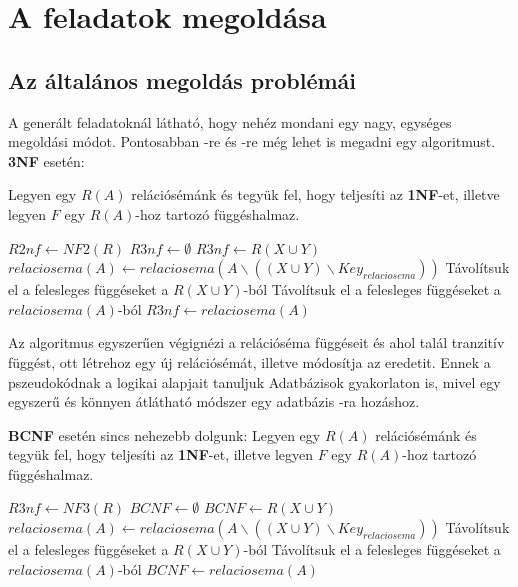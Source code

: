 \chapter{A feladatok megoldása}

\section{Az általános megoldás problémái}

A generált feladatoknál látható, hogy nehéz mondani egy nagy, egységes megoldási módot. Pontosabban \nfh-re és \BCNF-re még lehet is megadni egy algoritmust. \textbf{3NF} esetén: \par
Legyen egy $R(A)$ relációsémánk és tegyük fel, hogy teljesíti az \textbf{1NF}-et, illetve legyen $F$ egy $R(A)$-hoz tartozó függéshalmaz.
\hfill \break
\begin{algorithmic}
        \State $R2nf \gets NF2(R)$
        \State $R3nf \gets \emptyset$
                    \State $R3nf \gets R(X\cup Y)$
                    \State $relaciosema(A) \gets relaciosema(A \backslash ((X\cup Y) \backslash Key_{relaciosema}))$ 
                    \State Távolítsuk el a felesleges függéseket a $R(X \cup Y)$-ból
                \EndIf
            \EndFor
            \State Távolítsuk el a felesleges függéseket a $relaciosema(A)$-ból
            \State $R3nf \gets relaciosema(A)$
        \EndFor
    \EndFunction
\end{algorithmic}
\hfill \break
Az algoritmus egyszerűen végignézi a relációséma függéseit és ahol talál tranzitív függést, ott létrehoz egy új relációsémát, illetve módosítja az eredetit. Ennek a pszeudokódnak a logikai alapjait tanuljuk Adatbázisok gyakorlaton is, mivel egy egyszerű és könnyen átlátható módszer egy adatbázis \nfh-ra hozáshoz. \par
\textbf{BCNF} esetén sincs nehezebb dolgunk:
Legyen egy $R(A)$ relációsémánk és tegyük fel, hogy teljesíti az \textbf{1NF}-et, illetve legyen $F$ egy $R(A)$-hoz tartozó függéshalmaz.
\hfill \break
\begin{algorithmic}
        \State $R3nf \gets NF3(R)$
        \State $BCNF \gets \emptyset$
                    \State $BCNF \gets R(X\cup Y)$
                    \State $relaciosema(A) \gets relaciosema(A \backslash ((X\cup Y) \backslash Key_{relaciosema}))$ 
                    \State Távolítsuk el a felesleges függéseket a $R(X \cup Y)$-ból
                \EndIf
            \EndFor
            \State Távolítsuk el a felesleges függéseket a $relaciosema(A)$-ból
            \State $BCNF \gets relaciosema(A)$
        \EndFor
    \EndFunction
\end{algorithmic}
